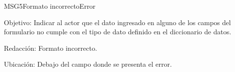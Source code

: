 \begin{mensaje}{MSG5}{Formato incorrecto}{Error}
	\item [Objetivo:] Indicar al actor que el dato ingresado en alguno de los campos del formulario no cumple con el tipo de dato definido en el diccionario de datos.
	\item[Redacción:] Formato incorrecto.
	\item [Ubicación:] Debajo del campo donde se presenta el error.
\end{mensaje}